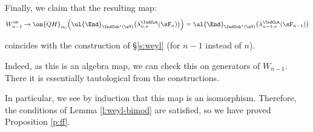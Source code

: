 Finally, we claim that the resulting map:
%
\[
W_{n-1}^{op} \to \on{QH}_{\alpha_0}\Big(\ul{\End}_{\IndCoh^*(\sY)}\big(\lambda_{n,*}^{\IndCoh}(\sF_n)\big)\Big) =
\ul{\End}_{\IndCoh^*(\sY)}\big(\lambda_{n-1,*}^{\IndCoh}(\sF_{n-1})\big)
\]

 coincides with the construction of \S \ref{s:weyl} (for $n-1$ instead of $n$).

Indeed, as this is an algebra map, we can check this on generators of
$W_{n-1}$. There it is essentially tautological from the constructions.

In particular, we see by induction that this map is an isomorphism.
Therefore, the conditions of Lemma \ref{l:weyl-bimod} are satisfied,
so we have proved Proposition \ref{p:ff}.
